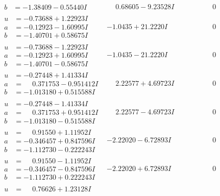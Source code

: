 \documentclass[1p]{elsarticle_modified}
\theoremstyle{definition}
\begin{document}
$$\begin{array}{c|c|c}
\begin{aligned}
b &= -1.38409 - 0.55440 I\end{aligned}
 & \phantom{-}0.68605 - 9.23528 I & \phantom{-0.000000 } 0 \\ \hline\begin{aligned}
u &= -0.73688 + 1.22923 I \\
a &= -0.12923 - 1.60995 I \\
b &= -1.40701 + 0.58675 I\end{aligned}
 & -1.0435 + 21.2220 I & \phantom{-0.000000 } 0 \\ \hline\begin{aligned}
u &= -0.73688 - 1.22923 I \\
a &= -0.12923 + 1.60995 I \\
b &= -1.40701 - 0.58675 I\end{aligned}
 & -1.0435 - 21.2220 I & \phantom{-0.000000 } 0 \\ \hline\begin{aligned}
u &= -0.27448 + 1.41334 I \\
a &= \phantom{-}0.371753 - 0.951412 I \\
b &= -1.013180 + 0.515588 I\end{aligned}
 & \phantom{-}2.22577 + 4.69723 I & \phantom{-0.000000 } 0 \\ \hline\begin{aligned}
u &= -0.27448 - 1.41334 I \\
a &= \phantom{-}0.371753 + 0.951412 I \\
b &= -1.013180 - 0.515588 I\end{aligned}
 & \phantom{-}2.22577 - 4.69723 I & \phantom{-0.000000 } 0 \\ \hline\begin{aligned}
u &= \phantom{-}0.91550 + 1.11952 I \\
a &= -0.346457 + 0.847596 I \\
b &= -1.112730 - 0.222243 I\end{aligned}
 & -2.22020 - 6.72893 I & \phantom{-0.000000 } 0 \\ \hline\begin{aligned}
u &= \phantom{-}0.91550 - 1.11952 I \\
a &= -0.346457 - 0.847596 I \\
b &= -1.112730 + 0.222243 I\end{aligned}
 & -2.22020 + 6.72893 I & \phantom{-0.000000 } 0 \\ \hline\begin{aligned}
u &= \phantom{-}0.76626 + 1.23128 I \\

\end{aligned}
\end{array}$$
\end{document}

